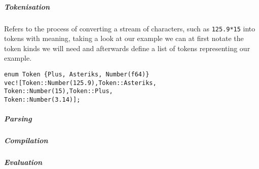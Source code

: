     \subparagraph*{Tokenisation} Refers to the process of converting a stream
    of characters, such as \texttt{125.9*15} into tokens with meaning, taking a
    look at our example we can at first notate the token kinds we will need and
    afterwards define a list of tokens representing our example.

        \begin{verbatim}
enum Token {Plus, Asteriks, Number(f64)}
vec![Token::Number(125.9),Token::Asteriks,
Token::Number(15),Token::Plus, 
Token::Number(3.14)];
        \end{verbatim}

    \subparagraph*{Parsing}
    \subparagraph*{Compilation}
    \subparagraph*{Evaluation}


